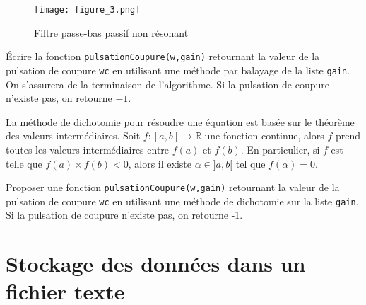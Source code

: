 \begin{figure}[!h]
\begin{center}
\texttt{[image: figure\_3.png]} 
\caption{\label{Fig3} Filtre passe-bas passif non résonant}
\end{center}
\end{figure}

\begin{tBox}
\question{} Écrire la fonction \texttt{pulsationCoupure(w,gain)} retournant la valeur de la pulsation de coupure \texttt{wc} en utilisant une méthode par balayage de la liste \texttt{gain}. On s'assurera de la terminaison de l'algorithme. Si la pulsation de coupure n'existe pas, on retourne $-1$.
\end{tBox}

\begin{dBox}
La méthode de dichotomie pour résoudre une équation est basée sur le théorème des valeurs intermédiaires. Soit $f : [a,b] \to \mathbb{R}$ une fonction continue, alors $f$ prend toutes les valeurs intermédiaires entre $f(a)$ et $f(b)$.
En particulier, si $f$ est telle que $f(a) \times f(b)<0$, alors il existe $\alpha \in ]a,b[$ tel que $f(\alpha) = 0$.
\end{dBox}

\begin{tBox} 
\question{} Proposer une fonction \texttt{pulsationCoupure(w,gain)} retournant la valeur de la pulsation de coupure \texttt{wc} en utilisant une méthode de dichotomie sur la liste \texttt{gain}. Si la pulsation de coupure n'existe pas, on retourne -1.
\end{tBox}




\section{Stockage des données dans un fichier texte}

